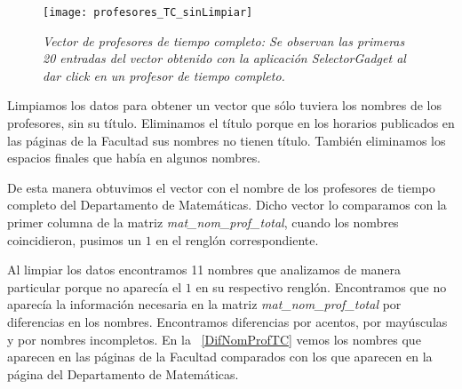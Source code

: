 \begin{figure}[H]
\centering
\texttt{[image: profesores\_TC\_sinLimpiar]} %
\caption[\textit{Vector de profesores de tiempo completo}]{\textit{Vector de profesores de tiempo completo: Se observan las primeras 20 entradas del vector obtenido con la aplicación SelectorGadget al dar click en un profesor de tiempo completo.}}\label{profTC_sinLimpiar}
\end{figure}

Limpiamos los datos para obtener un vector que sólo tuviera los nombres de los profesores, sin su título. Eliminamos el título porque en los horarios publicados en las páginas de la Facultad sus nombres no tienen título. También eliminamos los espacios finales que había en algunos nombres.

De esta manera obtuvimos el vector con el nombre de los profesores de tiempo completo del Departamento de Matemáticas. Dicho vector lo comparamos con la primer columna de la matriz \textit{mat\_nom\_prof\_total}, cuando los nombres coincidieron, pusimos un $1$ en el renglón correspondiente.

Al limpiar los datos encontramos 11 nombres que analizamos de manera particular porque no aparecía el $1$ en su respectivo renglón. Encontramos que no aparecía la información necesaria en la matriz \textit{mat\_nom\_prof\_total} por diferencias en los nombres. Encontramos diferencias por acentos, por mayúsculas y por nombres incompletos. En la \tablename{~\ref{DifNomProfTC}} vemos los nombres que aparecen en las páginas de la Facultad comparados con los que aparecen en la página del Departamento de Matemáticas.

